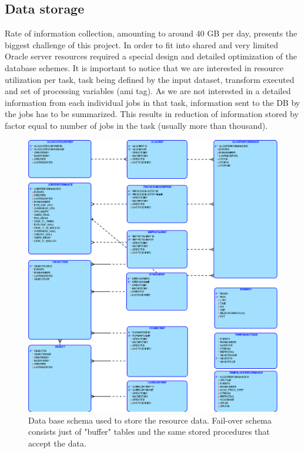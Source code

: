 \documentclass[a4paper]{jpconf}
\begin{document}
\subsection{Data storage}

Rate of information collection, amounting to around 40 GB per day, presents the biggest challenge of this project. In order to fit into shared and very limited Oracle server resources required a special design and detailed optimization of the database schemes. It is important to notice that we are interested in resource utilization per task, task being defined by the input dataset, transform executed and set of processing variables (ami tag). As we are not interested in a detailed information from each individual jobs in that task, information sent to the DB by the jobs has to be summarized. This results in reduction of information stored by factor equal to number of jobs in the task (usually more than thousand).  
\begin{figure}
  \centering
  \includegraphics[width=\columnwidth]{performanceInAMIdesign.eps}
  \caption{Data base schema used to store the resource data. Fail-over schema consists just of "buffer" tables and the same stored procedures that accept the data.}
  \label{fig:dbschema}
\end{figure}
\end{document}
